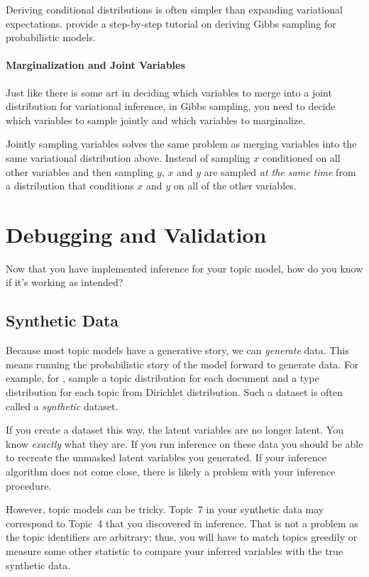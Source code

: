 Deriving conditional distributions is often simpler than expanding
variational expectations.  \citet{hardisty-10} provide a step-by-step tutorial on deriving
Gibbs sampling for probabilistic models.

\paragraph{Marginalization and Joint Variables}

Just like there is some art in deciding which variables to merge into
a joint distribution for variational inference, in Gibbs sampling, you
need to decide which variables to sample jointly and which variables
to marginalize.

Jointly sampling variables solves the same problem as merging
variables into the same variational distribution above.  Instead of
sampling $x$ conditioned on all other variables and then sampling $y$,
$x$ and $y$ are sampled \emph{at the same time} from a distribution
that conditions $x$ and $y$ on all of the other variables.

\section{Debugging and Validation}

Now that you have implemented inference for your topic model, how do
you know if it's working as intended?

\subsection{Synthetic Data}

Because most topic models have a generative story, we can
\emph{generate} data.  This means running the probabilistic story of
the model forward to generate data.  For example, for ,
sample a topic distribution for each document and a type distribution
for each topic from Dirichlet distribution.  Such a dataset is often
called a \emph{synthetic} dataset.

If you create a dataset this way, the latent variables are no longer
latent.  You know \emph{exactly} what they are.  If you run inference
on these data you should be able to recreate the unmasked latent
variables you generated.  If your inference algorithm does not come
close, there is likely a problem with your inference procedure.

However, topic models can be tricky.  Topic~7 in your synthetic data
may correspond to Topic~4 that you discovered in inference.  That is
not a problem as the topic identifiers are arbitrary; thus, you will
have to match topics greedily or measure some other statistic to
compare your inferred variables with the true synthetic data.

